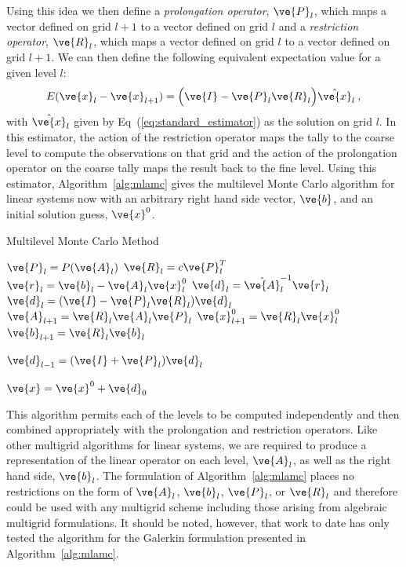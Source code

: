\documentclass[note]{TechNote}
\begin{document}
Using this idea we then define a \textit{prolongation operator},
$\ve{P}_l$, which maps a vector defined on grid $l+1$ to a
vector defined on grid $l$ and a \textit{restriction operator},
$\ve{R}_l$, which maps a vector defined on grid $l$ to a
vector defined on grid $l+1$. We can then define the following
equivalent expectation value for a given level $l$:
\begin{equation}
  E(\ve{x}_{l} - \ve{x}_{l+1}) = \Big(\ve{I} - \ve{P}_l
  \ve{R}_l\Big) \hat{\ve{x}}_{l}\:,
  \label{eq:level_expectation}
\end{equation}
with $\hat{\ve{x}}_{l}$ given by Eq~(\ref{eq:standard_estimator}) as
the solution on grid $l$. In this estimator, the action of the
restriction operator maps the tally to the coarse level to compute the
observations on that grid and the action of the prolongation operator
on the coarse tally maps the result back to the fine level. Using this
estimator, Algorithm~\ref{alg:mlamc} gives the multilevel Monte Carlo
algorithm for linear systems now with an arbitrary right hand side
vector, $\ve{b}$, and an initial solution guess, $\ve{x}^0$.
\begin{algorithm}[h!]
  \caption{Multilevel Monte Carlo Method}
  \label{alg:mlamc}
  \begin{algorithmic}[1]
    \State $\ve{P}_l = P(\ve{A}_l)$
    \State $\ve{R}_l = c \ve{P}_l^T$
    \State $\ve{r}_l = \ve{b}_l - \ve{A}_l \ve{x}_l^0$
    \State $\ve{d}_l = \hat{\ve{A}}_l^{-1} \ve{r}_l$
    \State $\ve{d}_l = (\ve{I} - \ve{P}_l\ve{R}_l) \ve{d}_{l}$
    \State $\ve{A}_{l+1} = \ve{R}_l \ve{A}_l \ve{P}_l$
    \State $\ve{x}_{l+1}^0 = \ve{R}_l \ve{x}_l^0$
    \State $\ve{b}_{l+1} = \ve{R}_l \ve{b}_l$
    \EndIf
    \EndFor

    \State $\ve{d}_{l-1} = ( \ve{I} + \ve{P}_{l} ) \ve{d}_{l}$
    \EndFor

    \State $\ve{x} = \ve{x}^0 + \ve{d}_0$

  \end{algorithmic}
\end{algorithm}
This algorithm permits each of the levels to be computed independently
and then combined appropriately with the prolongation and restriction
operators. Like other multigrid algorithms for linear systems, we are
required to produce a representation of the linear operator on each
level, $\ve{A}_l$, as well as the right hand side, $\ve{b}_l$. The
formulation of Algorithm~\ref{alg:mlamc} places no restrictions on the
form of $\ve{A}_l$, $\ve{b}_l$, $\ve{P}_l$, or $\ve{R}_l$
and therefore could be used with any multigrid scheme including those
arising from algebraic multigrid formulations. It should be noted,
however, that work to date has only tested the algorithm for the
Galerkin formulation presented in Algorithm~\ref{alg:mlamc}.
\end{document}
